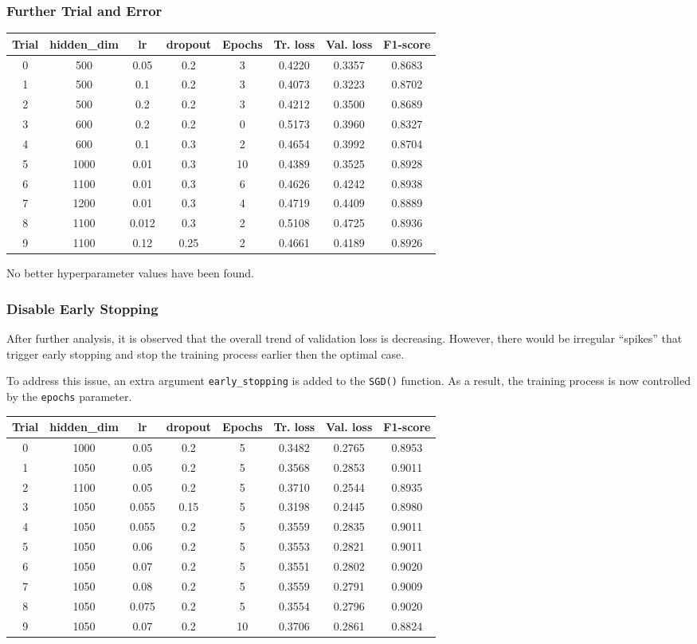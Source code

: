 \documentclass[11pt]{article}
\begin{document}
\hypertarget{further-trial-and-error}{%
\subsubsection{Further Trial and Error}\label{further-trial-and-error}}

\begin{longtable}[]{@{}cccccccc@{}}
\toprule
Trial & hidden\_dim & lr & dropout & Epochs & Tr. loss & Val. loss &
F1-score\tabularnewline
\midrule
\endhead
0 & 500 & 0.05 & 0.2 & 3 & 0.4220 & 0.3357 & 0.8683\tabularnewline
1 & 500 & 0.1 & 0.2 & 3 & 0.4073 & 0.3223 & 0.8702\tabularnewline
2 & 500 & 0.2 & 0.2 & 3 & 0.4212 & 0.3500 & 0.8689\tabularnewline
3 & 600 & 0.2 & 0.2 & 0 & 0.5173 & 0.3960 & 0.8327\tabularnewline
4 & 600 & 0.1 & 0.3 & 2 & 0.4654 & 0.3992 & 0.8704\tabularnewline
5 & 1000 & 0.01 & 0.3 & 10 & 0.4389 & 0.3525 & 0.8928\tabularnewline
6 & 1100 & 0.01 & 0.3 & 6 & 0.4626 & 0.4242 & 0.8938\tabularnewline
7 & 1200 & 0.01 & 0.3 & 4 & 0.4719 & 0.4409 & 0.8889\tabularnewline
8 & 1100 & 0.012 & 0.3 & 2 & 0.5108 & 0.4725 & 0.8936\tabularnewline
9 & 1100 & 0.12 & 0.25 & 2 & 0.4661 & 0.4189 & 0.8926\tabularnewline
\bottomrule
\end{longtable}

No better hyperparameter values have been found.

\hypertarget{disable-early-stopping}{%
\subsubsection{Disable Early Stopping}\label{disable-early-stopping}}

After further analysis, it is observed that the overall trend of
validation loss is decreasing. However, there would be irregular
``spikes'' that trigger early stopping and stop the training process
earlier then the optimal case.

To address this issue, an extra argument \texttt{early\_stopping} is
added to the \texttt{SGD()} function. As a result, the training process
is now controlled by the \texttt{epochs} parameter.

\begin{longtable}[]{@{}cccccccc@{}}
\toprule
Trial & hidden\_dim & lr & dropout & Epochs & Tr. loss & Val. loss &
F1-score\tabularnewline
\midrule
\endhead
0 & 1000 & 0.05 & 0.2 & 5 & 0.3482 & 0.2765 & 0.8953\tabularnewline
1 & 1050 & 0.05 & 0.2 & 5 & 0.3568 & 0.2853 & 0.9011\tabularnewline
2 & 1100 & 0.05 & 0.2 & 5 & 0.3710 & 0.2544 & 0.8935\tabularnewline
3 & 1050 & 0.055 & 0.15 & 5 & 0.3198 & 0.2445 & 0.8980\tabularnewline
4 & 1050 & 0.055 & 0.2 & 5 & 0.3559 & 0.2835 & 0.9011\tabularnewline
5 & 1050 & 0.06 & 0.2 & 5 & 0.3553 & 0.2821 & 0.9011\tabularnewline
6 & 1050 & 0.07 & 0.2 & 5 & 0.3551 & 0.2802 & 0.9020\tabularnewline
7 & 1050 & 0.08 & 0.2 & 5 & 0.3559 & 0.2791 & 0.9009\tabularnewline
8 & 1050 & 0.075 & 0.2 & 5 & 0.3554 & 0.2796 & 0.9020\tabularnewline
9 & 1050 & 0.07 & 0.2 & 10 & 0.3706 & 0.2861 & 0.8824\tabularnewline
\bottomrule
\end{longtable}
\end{document}
